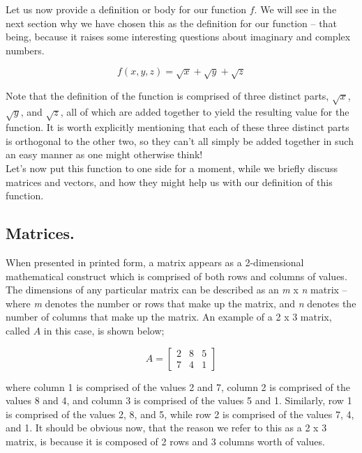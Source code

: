 \documentclass{article}
\begin{document}
Let us now provide a definition or body for our function \begin{math} f \end{math}. We will see in the next section
why we have chosen this as the definition for our function -- that being, because it raises some interesting questions
about imaginary and complex numbers.

\begin{equation}
  f(x,y,z) = \sqrt{x} + \sqrt{y} + \sqrt{z}
\end{equation}

Note that the definition of the function is comprised of three distinct parts, $\sqrt{x}$, $\sqrt{y}$, and
$\sqrt{z}$, all of which are added together to yield the resulting value for the function. It is worth explicitly
mentioning that each of these three distinct parts is orthogonal to the other two, so they can't all simply be 
added together in such an easy manner as one might otherwise think!\\

Let's now put this function to one side for a moment, while we briefly discuss matrices and vectors, and how they might
help us with our definition of this function.


\subsection{Matrices.}

When presented in printed form, a matrix appears as a 2-dimensional mathematical construct
which is comprised of both rows and columns of values. The dimensions of any particular matrix can be described
as an \textit{m} x \textit{n} matrix -- where \textit{m} denotes the number or rows that make up the matrix, and
\textit{n} denotes the number of columns that make up the matrix. An example of a 2 x 3 
matrix, called $A$ in this case, is shown below;

\begin{equation*}
A = 
\begin{bmatrix}
2 & 8 & 5\\
7 & 4 & 1
\end{bmatrix}
\end{equation*}

where column 1 is comprised of the values 2 and 7, column 2 is comprised of the values 8 and 4, and column 3 is
comprised of the values 5 and 1. Similarly, row 1 is comprised of the values 2, 8, and 5, while row 2 is comprised
of the values 7, 4, and 1. It should be obvious now, that the reason we refer to this as a 2 x 3 matrix, is because
it is composed of 2 rows and 3 columns worth of values.\\
\end{document}
